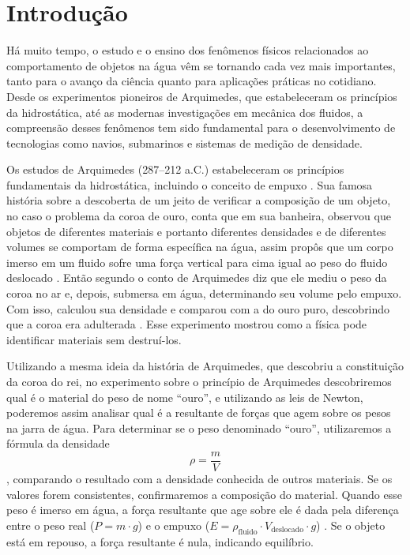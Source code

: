 \section{Introdução}

Há muito tempo, o estudo e o ensino dos fenômenos físicos relacionados ao
comportamento de objetos na água vêm se tornando cada vez mais importantes,
tanto para o avanço da ciência quanto para aplicações práticas no cotidiano.
Desde os experimentos pioneiros de Arquimedes, que estabeleceram os princípios
da hidrostática, até as modernas investigações em mecânica dos fluidos, a
compreensão desses fenômenos tem sido fundamental para o desenvolvimento de
tecnologias como navios, submarinos e sistemas de medição de densidade.

Os estudos de Arquimedes (287--212 a.C.) estabeleceram os princípios
fundamentais da hidrostática, incluindo o conceito de empuxo \cite{meneses2018}.
Sua famosa história sobre a descoberta de um jeito de verificar a composição de
um objeto, no caso o problema da coroa de ouro, conta que em sua banheira,
observou que objetos de diferentes materiais e portanto diferentes densidades e
de diferentes volumes se comportam de forma específica na água, assim propôs que
um corpo imerso em um fluido sofre uma força vertical para cima igual ao peso do
fluido deslocado \cite{nussenzveig2014}. Então segundo o conto de Arquimedes diz
que ele mediu o peso da coroa no ar e, depois, submersa em água, determinando
seu volume pelo empuxo. Com isso, calculou sua densidade e comparou com a do
ouro puro, descobrindo que a coroa era adulterada \cite{thompson2008}. Esse
experimento mostrou como a física pode identificar materiais sem destruí-los.

Utilizando a mesma ideia da história de Arquimedes, que descobriu a constituição
da coroa do rei, no experimento sobre o princípio de Arquimedes descobriremos
qual é o material do peso de nome ``ouro'', e utilizando as leis de Newton,
poderemos assim analisar qual é a resultante de forças que agem sobre os pesos
na jarra de água. Para determinar se o peso denominado ``ouro'', utilizaremos a
fórmula da densidade
\begin{equation}
	\rho = \frac{m}{V} \label{eq:densidade}
\end{equation}
\cite{nussenzveig2014}, comparando o resultado com a densidade conhecida de
outros materiais. Se os valores forem consistentes, confirmaremos a composição
do material. Quando esse peso é imerso em água, a força resultante que age sobre
ele é dada pela diferença entre o peso real ($P = m \cdot g$) e o empuxo ($E =
\rho_{\text{fluido}} \cdot V_{\text{deslocado}} \cdot g$)
\cite{nussenzveig2014}. Se o objeto está em repouso, a força resultante é nula,
indicando equilíbrio.

